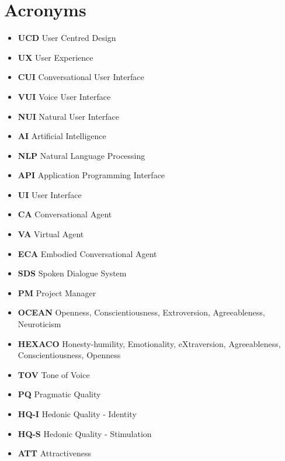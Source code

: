\chapter*{Acronyms}

\begin{itemize}[label={}]
    \item \textbf{UCD} \hspace{2mm} User Centred Design
    \item \textbf{UX} \hspace{2mm} User Experience
    \item \textbf{CUI} \hspace{2mm} Conversational User Interface
    \item \textbf{VUI} \hspace{2mm} Voice User Interface
    \item \textbf{NUI} \hspace{2mm} Natural User Interface
    \item \textbf{AI} \hspace{2mm} Artificial Intelligence
    \item \textbf{NLP} \hspace{2mm} Natural Language Processing
    \item \textbf{API} \hspace{2mm} Application Programming Interface
    \item \textbf{UI} \hspace{2mm} User Interface
    \item \textbf{CA} \hspace{2mm} Conversational Agent
    \item \textbf{VA} \hspace{2mm} Virtual Agent
    \item \textbf{ECA} \hspace{2mm} Embodied Conversational Agent
    \item \textbf{SDS} \hspace{2mm} Spoken Dialogue System
    \item \textbf{PM} \hspace{2mm} Project Manager
    \item \textbf{OCEAN} \hspace{2mm} Openness, Conscientiousness, Extroversion, Agreeableness, Neuroticism
    \item \textbf{HEXACO} \hspace{2mm} Honesty-humility, Emotionality, eXtraversion, Agreeableness, Conscientiousness, Openness
    \item \textbf{TOV} \hspace{2mm} Tone of Voice
    \item \textbf{PQ} \hspace{2mm} Pragmatic Quality
    \item \textbf{HQ-I} \hspace{2mm} Hedonic Quality - Identity
    \item \textbf{HQ-S}\hspace{2mm}  Hedonic Quality - Stimulation
    \item \textbf{ATT} \hspace{2mm} Attractiveness
\end{itemize}
